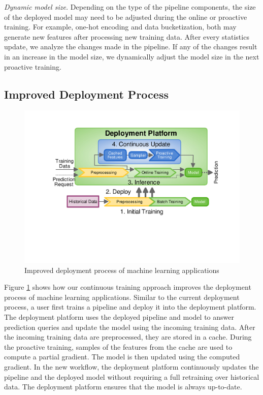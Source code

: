 \textit{Dynamic model size.}
Depending on the type of the pipeline components, the size of the deployed model may need to be adjusted during the online or proactive training.
For example, one-hot encoding and data bucketization, both may generate new features after processing new training data.
After every statistics update, we analyze the changes made in the pipeline.
If any of the changes result in an increase in the model size, we dynamically adjust the model size in the next proactive training. 


\subsection{Improved Deployment Process}
\begin{figure}[t]
\centering
\includegraphics[width=\columnwidth]{../images/generic-improved-example-v2.pdf}
\caption{Improved deployment process of machine learning applications}
\label{fig:improved-example}
\end{figure}

Figure \ref{fig:improved-example} shows how our continuous training approach improves the deployment process of machine learning applications.
Similar to the current deployment process, a user first trains a pipeline and deploy it into the deployment platform.
The deployment platform uses the deployed pipeline and model to answer prediction queries and update the model using the incoming training data.
After the incoming training data are preprocessed, they are stored in a cache.
During the proactive training, samples of the features from the cache are used to compute a partial gradient.
The model is then updated using the computed gradient.
In the new workflow, the deployment platform continuously updates the pipeline and the deployed model without requiring a full retraining over historical data.
The deployment platform ensures that the model is always up-to-date.
